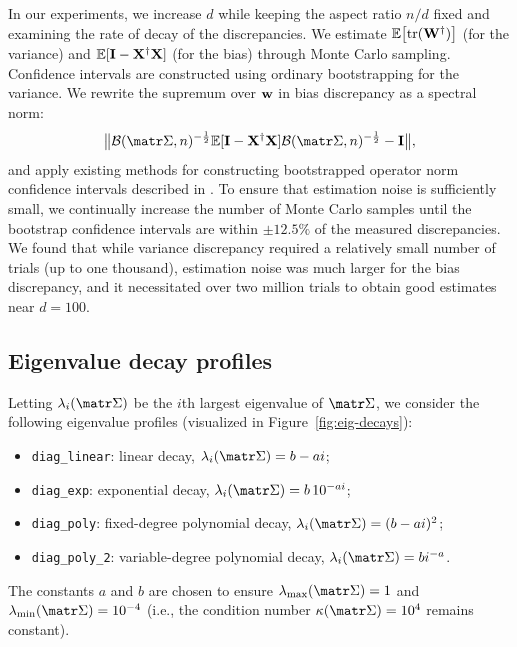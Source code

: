 In our experiments, we increase $d$ while keeping the aspect ratio $n/d$
fixed and examining the rate of decay of the discrepancies.
We estimate $\mathbb E\big[\mathrm{tr}(\mathbf W^\dagger)\big]$ (for the variance) and
$\mathbb E[\mathbf I-\mathbf X^\dagger\mathbf X]$ (for the bias) through Monte Carlo sampling.
Confidence intervals are constructed using ordinary bootstrapping for
the variance. We rewrite the supremum over $\mathbf w$ in bias discrepancy as
a spectral norm:
\[\big\|\Bc(\Sigmab,n)^{-\frac12}\E[\I-\X^\dagger\X]\Bc(\Sigmab,n)^{-\frac12} -
  \I\big\|,\]
and apply existing methods for constructing bootstrapped operator
norm confidence intervals described in \cite{lopes2019bootstrapping}.  To
ensure that estimation noise is sufficiently small, we continually increase the
number of Monte Carlo samples until the bootstrap confidence intervals are
within $\pm 12.5\%$ of the measured discrepancies.  We found that while
variance discrepancy required a relatively small number of trials (up
to one thousand), estimation noise was much larger for the bias
discrepancy, and it necessitated over two million trials to obtain
good estimates near $d=100$.

\subsection{Eigenvalue decay profiles}
\label{sec:eig-decay-details}

Letting $\lambda_i(\Sigmab)$ be the $i$th largest eigenvalue of
$\Sigmab$, we consider the
following eigenvalue profiles (visualized in Figure~\ref{fig:eig-decays}):
\begin{itemize}
  \item \texttt{diag\_linear}: linear decay, $\lambda_i(\Sigmab)= b-a i$;
  \item \texttt{diag\_exp}: exponential decay, $\lambda_i(\Sigmab) = b\,10^{- a i} $;
  \item \texttt{diag\_poly}: fixed-degree polynomial decay, $\lambda_i(\Sigmab) = (b-a i)^2$;
  \item \texttt{diag\_poly\_2}: variable-degree polynomial decay, $\lambda_i(\Sigmab) = b i^{-a}$.
\end{itemize}
The constants $a$ and $b$ are chosen to ensure $\lambda_{\text{max}}(\Sigmab) = 1$ and
$\lambda_{\text{min}}(\Sigmab) = 10^{-4}$ (i.e., the condition number
$\kappa(\Sigmab) = 10^{4}$ remains constant).
